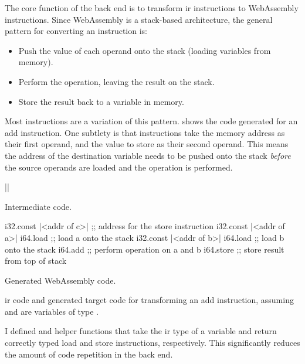 \documentclass[00-main.tex]{subfiles}
\begin{document}
The core function of the back end is to transform \gls{ir} instructions to WebAssembly instructions.
Since WebAssembly is a stack-based architecture, the general pattern for converting an instruction is:
\begin{itemize}[nosep]
\item Push the value of each operand onto the stack (loading variables from memory).
\item Perform the operation, leaving the result on the stack.
\item Store the result back to a variable in memory.
\end{itemize}
Most instructions are a variation of this pattern.
 shows the code generated for an add instruction.
One subtlety is that  instructions take the memory address as their first operand, and the value to store as their second operand.
This means the address of the destination variable needs to be pushed onto the stack \emph{before} the source operands are loaded and the operation is performed.

\begin{listing}[t]
  \begin{sublisting}[b]{0.28\textwidth}
    \begin{TextListing}
      ||
    \end{TextListing}
    \caption{Intermediate code.}
  \end{sublisting}
  \hfill
  \begin{sublisting}[b]{0.7\textwidth}
    \begin{WasmListing}
      i32.const |<addr of c>|  ;; address for the store instruction
      i32.const |<addr of a>|
      i64.load               ;; load a onto the stack
      i32.const |<addr of b>|
      i64.load               ;; load b onto the stack
      i64.add                ;; perform operation on a and b
      i64.store              ;; store result from top of stack
    \end{WasmListing}
    \caption{Generated WebAssembly code.}
  \end{sublisting}
  \caption{\Gls{ir} code and generated target code for transforming an add instruction, assuming  and  are variables of type .}
  \label{lst:converting add instr to wasm code}
\end{listing}

I defined  and  helper functions that take the \gls{ir} type of a variable and return correctly typed load and store instructions, respectively.
This significantly reduces the amount of code repetition in the back end.
\end{document}
